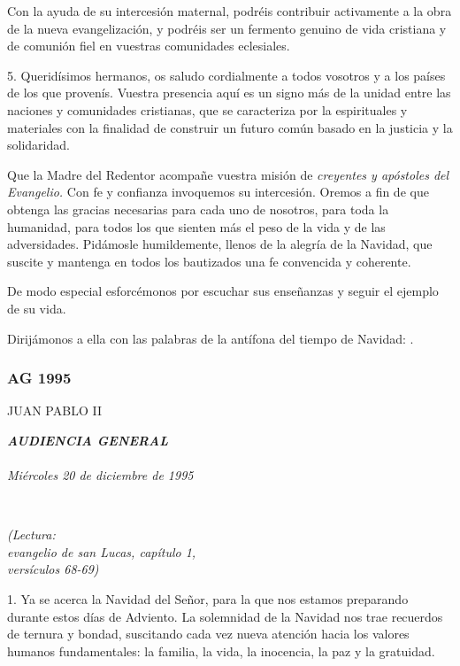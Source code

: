 Con la ayuda de su intercesión maternal, podréis contribuir activamente a la obra de la nueva evangelización, y podréis ser un fermento genuino de vida cristiana y de comunión fiel en vuestras comunidades eclesiales.

5. Queridísimos hermanos, os saludo cordialmente a todos vosotros y a los países de los que provenís. Vuestra presencia aquí es un signo más de la unidad entre las naciones y comunidades cristianas, que se caracteriza por la  espirituales y materiales con la finalidad de construir un futuro común basado en la justicia y la solidaridad.

Que la Madre del Redentor acompañe vuestra misión de \emph{creyentes y apóstoles del Evangelio.} Con fe y confianza invoquemos su intercesión. Oremos a fin de que obtenga las gracias necesarias para cada uno de nosotros, para toda la humanidad, para todos los que sienten más el peso de la vida y de las adversidades. Pidámosle humildemente, llenos de la alegría de la Navidad, que suscite y mantenga en todos los bautizados una fe convencida y coherente.

De modo especial esforcémonos por escuchar sus enseñanzas y seguir el ejemplo de su vida.

Dirijámonos a ella con las palabras de la antífona del tiempo de Navidad: .

\subsubsection{AG 1995} JUAN PABLO II

\textbf{\emph{AUDIENCIA GENERAL\\ }}\\ \emph{Miércoles 20 de diciembre de 1995}

~

\emph{(Lectura:\\ evangelio de san Lucas, capítulo 1,\\ versículos 68-69)}

1. Ya se acerca la Navidad del Señor, para la que nos estamos preparando durante estos días de Adviento. La solemnidad de la Navidad nos trae recuerdos de ternura y bondad, suscitando cada vez nueva atención hacia los valores humanos fundamentales: la familia, la vida, la inocencia, la paz y la gratuidad.

